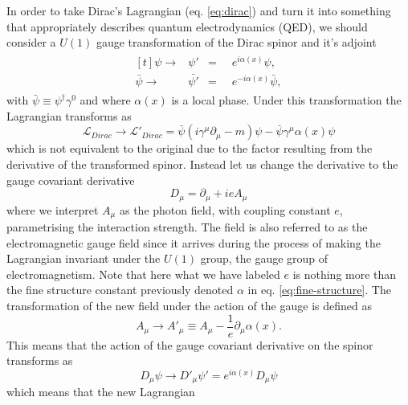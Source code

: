 In order to take Dirac's Lagrangian (eq. \ref{eq:dirac}) and turn it into
something that appropriately describes quantum electrodynamics (QED), we should
consider a $U(1)$ gauge transformation of the Dirac spinor and it's adjoint
\begin{equation}
  \label{eq:u1trans}
  \begin{split}
    \begin{aligned}[t] \psi \rightarrow &\psi' &=&\;\; e^{i\alpha(x)}\psi,\\
\bar{\psi} \rightarrow &\bar{\psi'} &=&\;\; e^{-i\alpha(x)}\bar{\psi},
    \end{aligned}
  \end{split}
\end{equation} with $\bar{\psi} \equiv \psi^{\dagger}\gamma^{0}$ and where
$\alpha(x)$ is a local phase. Under this transformation the Lagrangian
transforms as
\begin{equation}
  \label{eq:diracu1} \mathcal{L}_{Dirac} \rightarrow \mathcal{L}'_{Dirac} =
\bar{\psi}(i\gamma^{\mu}\partial_{\mu} - m)\psi -
\bar{\psi}\gamma^{\mu}\alpha(x)\psi
\end{equation} which is not equivalent to the original due to the factor
resulting from the derivative of the transformed spinor. Instead let us change
the derivative to the gauge covariant derivative
\begin{equation}
  \label{eq:covariant-em} D_\mu = \partial_{\mu} + ieA_{\mu}
\end{equation} where we interpret $A_{\mu}$ as the photon field, with coupling
constant $e$, parametrising the interaction strength. The field is also referred
to as the electromagnetic gauge field since it arrives during the process of
making the Lagrangian invariant under the $U(1)$ group, the gauge group of
electromagnetism. Note that here what we have labeled $e$ is nothing more than
the fine structure constant previously denoted $\alpha$ in eq.
\ref{eq:fine-structure}. The transformation of the new field under the action of
the gauge is defined as
\begin{equation}
  \label{eq:em-field-gauge} A_{\mu} \rightarrow A'_{\mu} \equiv A_{\mu} -
\frac{1}{e}\partial_{\mu}\alpha(x).
\end{equation} This means that the action of the gauge covariant derivative on
the spinor transforms as
\begin{equation}
  \label{eq:cov-trans} D_{\mu}\psi \rightarrow D'_{\mu}\psi' =
e^{i\alpha(x)}D_{\mu}\psi
\end{equation} which means that the new Lagrangian
